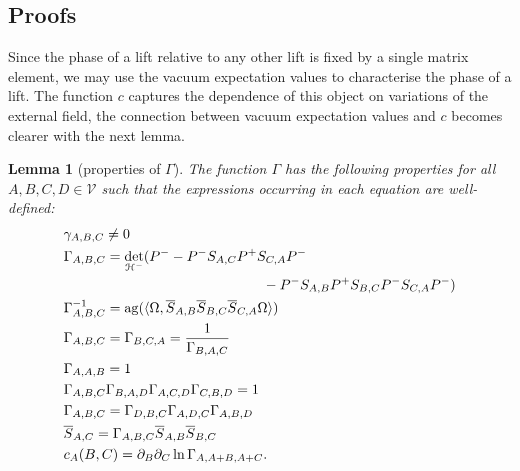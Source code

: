\documentclass[b5paper,draft,openbib,12pt]{memoir}
\newtheorem{Lemma}[Def]{Lemma}
\DeclareMathOperator{\ag}{ag}
\begin{document}
\subsection{Proofs}


Since the phase of a lift relative to any other lift is fixed by a single 
matrix element, we may use the vacuum expectation values to characterise the
phase of a lift. The function \(c\) captures the dependence of this object on 
variations of the external field, the connection between vacuum expectation
values and \(c\) becomes clearer with the next lemma.

\begin{Lemma}[properties of \(\Gamma\)]\label{gamma attri}
The function \(\Gamma\) has the following properties for all  \(A,B,C,D\in\mathcal{V}\) such that the expressions occurring in each equation are well-defined:
\begin{align}\label{gamma attri0}
&\gamma_{A,B,C}\neq 0\\\notag
&\Gamma_{A,B,C}=\det_{\mathcal{H}^-}(P^--P^-S_{A,C}P^+S_{C,A}P^- \\\label{gamma attri1}
&\hspace{5cm}- P^- S_{A,B} P^+ S_{B,C} P^- S_{C,A} P^-)\\\label{gamma attri2}
&\Gamma_{A,B,C}^{-1}=\ag(\langle \Omega, \overline{S}_{A,B} \overline{S}_{B,C} \overline{S}_{C,A}\Omega\rangle )\\\label{gamma attri3}
&\Gamma_{A,B,C}=\Gamma_{B,C,A}=\frac{1}{\Gamma_{B,A,C}}\\\label{gamma attri4}
&\Gamma_{A,A,B}=1\\\label{gamma attri5}
&\Gamma_{A,B,C}\Gamma_{B,A,D}\Gamma_{A,C,D}\Gamma_{C,B,D}=1 \\\label{gamma attri6}
&\Gamma_{A,B,C}=\Gamma_{D,B,C}\Gamma_{A,D,C}\Gamma_{A,B,D} \\\label{gamma attri7}
&\overline{S}_{A,C}=\Gamma_{A,B,C}\overline{S}_{A,B}\overline{S}_{B,C}\\\label{gamma attri8}
&c_A(B,C)=\partial_B \partial_C \ln \Gamma_{A,A+B,A+C}.
\end{align}
\end{Lemma}
\end{document}
